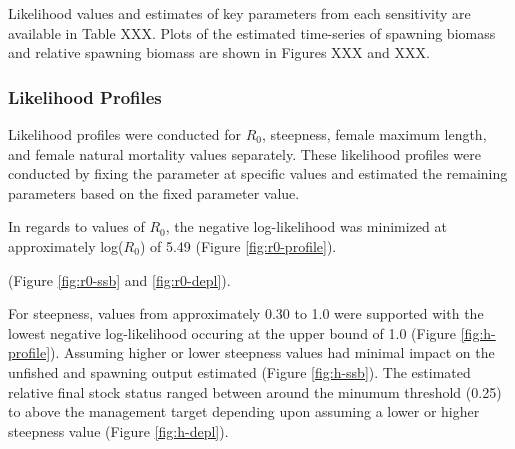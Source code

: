 \documentclass[11pt,
  english,
  a4paper,
]{article}
\begin{document}
Likelihood values and estimates of key parameters from each sensitivity are available in Table XXX. Plots of the estimated time-series of spawning biomass and relative spawning biomass are shown in Figures XXX and XXX.

\leavevmode\tagmcend\tagstructend\par


\hypertarget{likelihood-profiles}{%
\subsubsection{Likelihood Profiles}\label{likelihood-profiles}}

\leavevmode\tagmcend\tagstructend


Likelihood profiles were conducted for {\(R_0\)\leavevmode\tagmcend\tagstructend}, steepness, female maximum length, and female natural mortality values separately. These likelihood profiles were conducted by fixing the parameter at specific values and estimated the remaining parameters based on the fixed parameter value.

\leavevmode\tagmcend\tagstructend\par


In regards to values of {\(R_0\)\leavevmode\tagmcend\tagstructend}, the negative log-likelihood was minimized at approximately log({\(R_0\)\leavevmode\tagmcend\tagstructend}) of 5.49 (Figure \ref{fig:r0-profile}).

\leavevmode\tagmcend\tagstructend\par


(Figure \ref{fig:r0-ssb} and \ref{fig:r0-depl}).

\leavevmode\tagmcend\tagstructend\par


For steepness, values from approximately 0.30 to 1.0 were supported with the lowest negative log-likelihood occuring at the upper bound of 1.0 (Figure \ref{fig:h-profile}). Assuming higher or lower steepness values had minimal impact on the unfished and spawning output estimated (Figure \ref{fig:h-ssb}). The estimated relative final stock status ranged between around the minumum threshold (0.25) to above the management target depending upon assuming a lower or higher steepness value (Figure \ref{fig:h-depl}).
\end{document}
